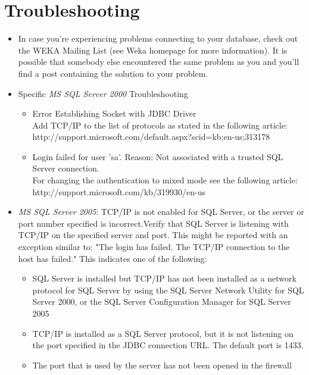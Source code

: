 \section{Troubleshooting}
\begin{itemize}
	\item In case you're experiencing problems connecting to your database, check out the WEKA Mailing List (see Weka homepage for more information). It is possible that somebody else encountered the same problem as you and you'll find a post containing the solution to your problem.

	\item Specific \textit{MS SQL Server 2000} Troubleshooting
	\begin{itemize}
		\item Error Establishing Socket with JDBC Driver \\
		Add TCP/IP to the list of protocols as stated in the following article: \\ http://support.microsoft.com/default.aspx?scid=kb;en-us;313178
		\item Login failed for user 'sa'. Reason: Not associated with a trusted SQL Server connection. \\
		For changing the authentication to mixed mode see the following article: \\
		http://support.microsoft.com/kb/319930/en-us
	\end{itemize}

	\item \textit{MS SQL Server 2005}: TCP/IP is not enabled for SQL Server, or the server or port number specified is incorrect.Verify that SQL Server is listening with TCP/IP on the specified server and port. This might be reported with an exception similar to: "The login has failed. The TCP/IP connection to the host has failed." This indicates one of the following:
	\begin{itemize}
		\item SQL Server is installed but TCP/IP has not been installed as a network protocol for SQL Server by using the SQL Server Network Utility for SQL Server 2000, or the SQL Server Configuration Manager for SQL Server 2005
		\item TCP/IP is installed as a SQL Server protocol, but it is not listening on the port specified in the JDBC connection URL. The default port is 1433.
		\item The port that is used by the server has not been opened in the firewall
	\end{itemize}


\end{itemize}
